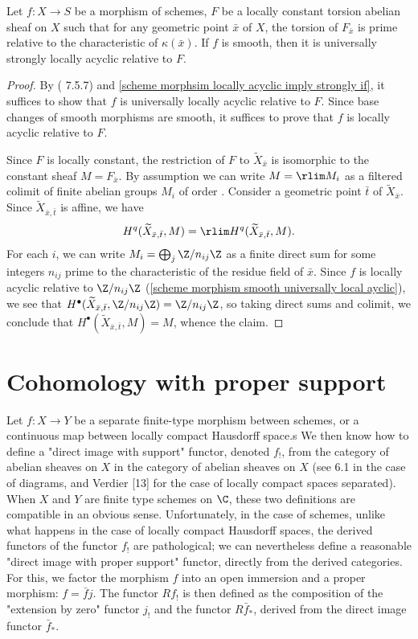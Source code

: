 \begin{corollary}\label{scheme morphism smooth locally acyclic for local constant torsion}
Let $f:X\to S$ be a morphism of schemes, $F$ be a locally constant torsion abelian sheaf on $X$ such that for any geometric point $\bar{x}$ of $X$, the torsion of $F_{\bar{x}}$ is prime relative to the characteristic of $\kappa(\bar{x})$. If $f$ is smooth, then it is universally strongly locally acyclic relative to $F$.
\end{corollary}
\begin{proof}
By (\cite{Fulei} 7.5.7) and \cref{scheme morphsim locally acyclic imply strongly if}, it suffices to show that $f$ is universally locally acyclic relative to $F$. Since base changes of smooth morphisms are smooth, it suffices to prove that $f$ is locally acyclic relative to $F$.\par
Since $F$ is locally constant, the restriction of $F$ to $\widetilde{X}_{\bar{x}}$ is isomorphic to the constant sheaf $M=F_{\bar{x}}$. By assumption we can write $M=\rlim M_i$ as a filtered colimit of finite abelian groups $M_i$ of order . Consider a geometric point $\bar{t}$ of $\widetilde{X}_{\bar{x}}$. Since $\widetilde{X}_{\bar{x},\bar{t}}$ is affine, we have
\[H^q(\widetilde{X}_{\bar{x},\bar{t}},M)=\rlim H^q(\widetilde{X}_{\bar{x},\bar{t}},M).\]
For each $i$, we can write $M_i=\bigoplus_j\Z/n_{ij}\Z$ as a finite direct sum for some integers $n_{ij}$ prime to the characteristic of the residue field of $\bar{x}$. Since $f$ is locally acyclic relative to $\Z/n_{ij}\Z$ (\cref{scheme morphism smooth universally local ayclic}), we see that $H^\bullet(\widetilde{X}_{\bar{x},\bar{t}},\Z/n_{ij}\Z)=\Z/n_{ij}\Z$, so taking direct sums and colimit, we conclude that $H^\bullet(\widetilde{X}_{\bar{x},\bar{t}},M)=M$, whence the claim.
\end{proof}

\section{Cohomology with proper support}
Let $f:X\to Y$ be a separate finite-type morphism between schemes, or a continuous map between locally compact Hausdorff space.s We then know how to define a "direct image with support" functor, denoted $f_!$, from the category of abelian sheaves on $X$ in the category of abelian sheaves on $X$ (see 6.1 in the case of diagrams, and Verdier [13] for the case of
locally compact spaces separated). When $X$ and $Y$ are finite type schemes on $\C$, these two definitions are compatible in an obvious sense. Unfortunately, in the case of schemes, unlike what happens in the case of locally compact Hausdorff spaces, the derived functors of the functor $f_!$ are pathological; we can nevertheless define a reasonable "direct image with proper support" functor, directly from the derived categories. For this, we factor the morphism $f$ into an open immersion and a proper morphism: $f=\bar{f}j$. The functor $Rf_!$ is then defined as the composition of the "extension by zero" functor $j_!$ and the functor $R\bar{f}_*$, derived from the direct image functor $\bar{f}_*$.

